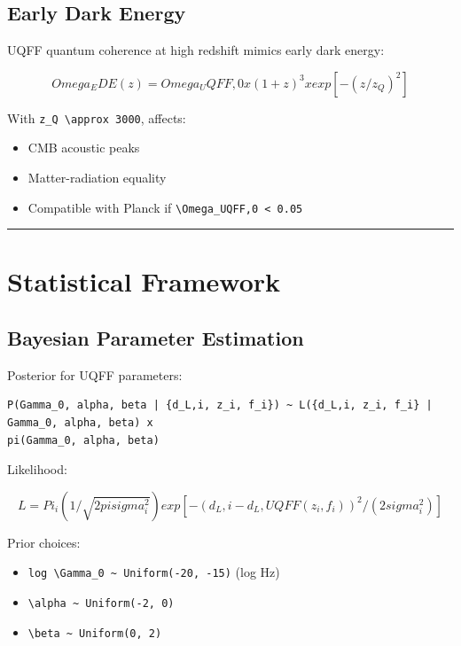 \documentclass[12pt,a4paper]{article}
\begin{document}
\subsection{Early Dark Energy}

UQFF quantum coherence at high redshift mimics early dark energy:

\begin{equation}
Omega_EDE(z) = Omega_UQFF,0 x (1+z)^3 x exp[-(z/z_Q)^2]
\end{equation}

With \texttt{z\_Q \textbackslash approx 3000}, affects:

\begin{itemize}
  \item CMB acoustic peaks
  \item Matter-radiation equality
  \item Compatible with Planck if \texttt{\textbackslash Omega\_UQFF,0 < 0.05}
\end{itemize}

\medskip\hrule\medskip

\section{Statistical Framework}

\subsection{Bayesian Parameter Estimation}

Posterior for UQFF parameters:

\begin{verbatim}
P(Gamma_0, alpha, beta | {d_L,i, z_i, f_i}) ~ L({d_L,i, z_i, f_i} | Gamma_0, alpha, beta) x
pi(Gamma_0, alpha, beta)
\end{verbatim}

Likelihood:

\begin{equation}
L = Pi_i (1/\sqrt{2pisigma_i^2}) exp[-(d_L,i - d_L,UQFF(z_i,f_i))^2 / (2sigma_i^2)]
\end{equation}

Prior choices:

\begin{itemize}
  \item \texttt{log \textbackslash Gamma\_0 \textasciitilde{} Uniform(-20, -15)} (log Hz)
  \item \texttt{\textbackslash alpha \textasciitilde{} Uniform(-2, 0)}
  \item \texttt{\textbackslash beta \textasciitilde{} Uniform(0, 2)}
\end{itemize}
\end{document}
